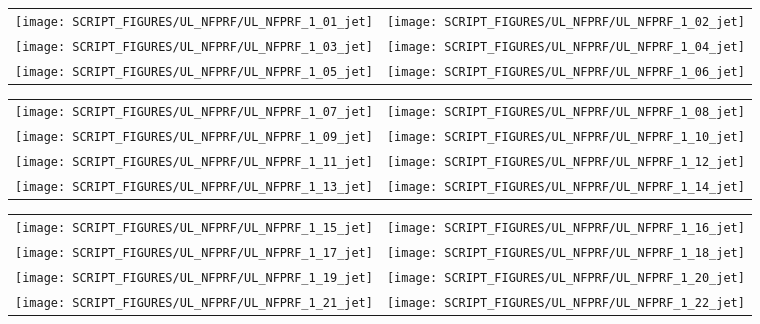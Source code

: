 \begin{figure}[h!]
\begin{tabular*}{\textwidth}{l@{\extracolsep{\fill}}r}
\texttt{[image: SCRIPT\_FIGURES/UL\_NFPRF/UL\_NFPRF\_1\_01\_jet]} &
\texttt{[image: SCRIPT\_FIGURES/UL\_NFPRF/UL\_NFPRF\_1\_02\_jet]} \\
\texttt{[image: SCRIPT\_FIGURES/UL\_NFPRF/UL\_NFPRF\_1\_03\_jet]} &
\texttt{[image: SCRIPT\_FIGURES/UL\_NFPRF/UL\_NFPRF\_1\_04\_jet]} \\
\texttt{[image: SCRIPT\_FIGURES/UL\_NFPRF/UL\_NFPRF\_1\_05\_jet]} &
\texttt{[image: SCRIPT\_FIGURES/UL\_NFPRF/UL\_NFPRF\_1\_06\_jet]}
\end{tabular*}
\label{UL_NFPRF_jet_1}
\end{figure}

\newpage

\begin{figure}[p]
\begin{tabular*}{\textwidth}{l@{\extracolsep{\fill}}r}
\texttt{[image: SCRIPT\_FIGURES/UL\_NFPRF/UL\_NFPRF\_1\_07\_jet]} &
\texttt{[image: SCRIPT\_FIGURES/UL\_NFPRF/UL\_NFPRF\_1\_08\_jet]} \\
\texttt{[image: SCRIPT\_FIGURES/UL\_NFPRF/UL\_NFPRF\_1\_09\_jet]} &
\texttt{[image: SCRIPT\_FIGURES/UL\_NFPRF/UL\_NFPRF\_1\_10\_jet]} \\
\texttt{[image: SCRIPT\_FIGURES/UL\_NFPRF/UL\_NFPRF\_1\_11\_jet]} &
\texttt{[image: SCRIPT\_FIGURES/UL\_NFPRF/UL\_NFPRF\_1\_12\_jet]} \\
\texttt{[image: SCRIPT\_FIGURES/UL\_NFPRF/UL\_NFPRF\_1\_13\_jet]} &
\texttt{[image: SCRIPT\_FIGURES/UL\_NFPRF/UL\_NFPRF\_1\_14\_jet]}
\end{tabular*}
\label{UL_NFPRF_jet_2}
\end{figure}

\begin{figure}[p]
\begin{tabular*}{\textwidth}{l@{\extracolsep{\fill}}r}
\texttt{[image: SCRIPT\_FIGURES/UL\_NFPRF/UL\_NFPRF\_1\_15\_jet]} &
\texttt{[image: SCRIPT\_FIGURES/UL\_NFPRF/UL\_NFPRF\_1\_16\_jet]} \\
\texttt{[image: SCRIPT\_FIGURES/UL\_NFPRF/UL\_NFPRF\_1\_17\_jet]} &
\texttt{[image: SCRIPT\_FIGURES/UL\_NFPRF/UL\_NFPRF\_1\_18\_jet]} \\
\texttt{[image: SCRIPT\_FIGURES/UL\_NFPRF/UL\_NFPRF\_1\_19\_jet]} &
\texttt{[image: SCRIPT\_FIGURES/UL\_NFPRF/UL\_NFPRF\_1\_20\_jet]} \\
\texttt{[image: SCRIPT\_FIGURES/UL\_NFPRF/UL\_NFPRF\_1\_21\_jet]} &
\texttt{[image: SCRIPT\_FIGURES/UL\_NFPRF/UL\_NFPRF\_1\_22\_jet]}
\end{tabular*}
\label{UL_NFPRF_jet_3}
\end{figure}


